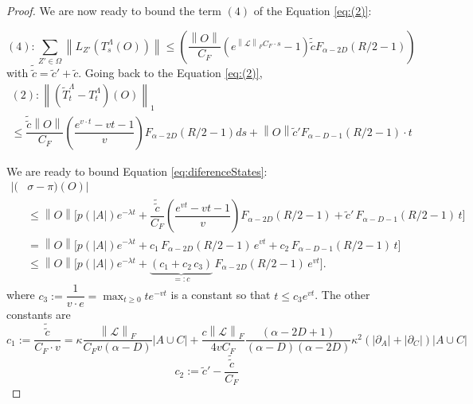 \documentclass[11pt]{article}
\numberwithin{equation}{section}
\numberwithin{figure}{section}
\numberwithin{table}{section}
\theoremstyle{definition}
\theoremstyle{plain}
\theoremstyle{remark}
\newcommand{\Li}{\mathcal{L}}
\newcommand{\T}{T^\Lambda}
\newcommand{\TT}{\widetilde{T}^\Lambda}
\newcommand{\norm}[1]{\left\lVert#1\right\rVert}
\newcommand{\normm}[2]{\left\lVert#1\right\rVert_{#2}}
\newcommand{\abs}[1]{\left \vert#1\right\vert}
\begin{document}
\begin{proof}
    We are now ready to bound the term $(4)$ of the Equation \eqref{eq:(2)}:
     
     \begin{equation}
         (4):\sum_{Z'\in \Omega} \norm{L_{Z'}(\T_s(O))}\leq\left ( \dfrac{\norm{O}}{C_F}\left ( e^{\normm{\Li}{F} C_F\cdot s}-1\right )\tilde{\tilde{c}}F_{\alpha-2D}(R/2-1)\right )
     \end{equation}
     with $
         \tilde{\tilde{c}}=\tilde{c}'+\tilde{c}
    $. Going back to the Equation \eqref{eq:(2)},
    \begin{multline}
        (2):\normm{(\TT_t-\T_t)(O)}{1}\\\leq  \dfrac{\tilde{\tilde{c}}\norm{O}}{C_F}\left ( \dfrac{e^{v\cdot t}-vt-1}{v} \right )F_{\alpha-2D}(R/2-1)ds        +\norm{O}\tilde{c}' F_{\alpha-D-1}(R/2-1)\cdot t
        \label{eq:clusteringTime}
     \end{multline}

     We are ready to bound Equation \eqref{eq:diferenceStates}:
    \begin{align}
|(&\sigma-\pi)(O)|\\
&\nonumber \le \norm{O}\Bigg[ p(\abs{A})e^{-\lambda t} + \dfrac{\tilde{\tilde{c}}}{C_F}\left(\dfrac{e^{vt}-vt-1}{v}\right)F_{\alpha-2D}(R/2-1) + \tilde{c}'\,F_{\alpha-D-1}(R/2-1)\,t \Bigg]
\\
&= \norm{O}\Big[ p(\abs{A})e^{-\lambda t} + c_1\,F_{\alpha-2D}(R/2-1)\,e^{vt} + c_2\,F_{\alpha-D-1}(R/2-1)\,t \Big] \nonumber\\
&\le \norm{O}\Big[ p(\abs{A})e^{-\lambda t} + \underbrace{(c_1+c_2\,c_3)}_{=:c}\,F_{\alpha-2D}(R/2-1)\,e^{vt} \Big]. \nonumber
\end{align}
     where $c_3:=\dfrac{1}{v\cdot e}=\max_{t\geq 0} t e^{-vt}$ is a constant so that $t\leq c_3 e^{vt}$. The other constants are
     \begin{equation}
         c_1:= \dfrac{\tilde{\tilde{c}}}{C_F \cdot v}=\kappa \dfrac{\normm{\Li}{F}}{C_Fv(\alpha-D)}\abs{A\cup C}+\dfrac{c\normm{\Li}{F}}{4vC_F}\dfrac{(\alpha-2D +1)}{(\alpha-D )(\alpha-2D)}\kappa^2 (\abs{\partial_{A}}+\abs{\partial_{C}})\abs{A\cup C}
     \end{equation}
     \begin{equation}
         c_2:= \tilde{c}'-\dfrac{\tilde{\tilde{c}}}{C_F}
     \end{equation}


\end{proof}
\end{document}
